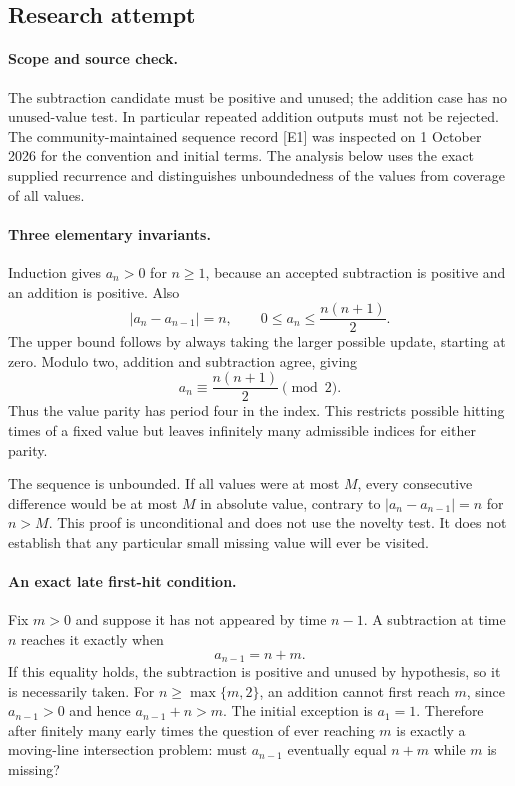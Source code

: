 \documentclass[11pt,a4paper]{article}
\begin{document}
\subsection{Research attempt}

\paragraph{Scope and source check.}
The subtraction candidate must be positive and unused; the addition
case has no unused-value test. In particular repeated addition outputs
must not be rejected. The community-maintained sequence record [E1]
was inspected on 1 October 2026 for the convention and initial terms.
The analysis below uses the exact supplied recurrence and distinguishes
unboundedness of the values from coverage of all values.

\paragraph{Three elementary invariants.}
Induction gives $a_n>0$ for $n\ge1$, because an accepted subtraction
is positive and an addition is positive. Also
\[
 |a_n-a_{n-1}|=n,\qquad
 0\le a_n\le\frac{n(n+1)}2.
\]
The upper bound follows by always taking the larger possible update,
starting at zero. Modulo two, addition and subtraction agree, giving
\[
                  a_n\equiv\frac{n(n+1)}2\pmod2.
\]
Thus the value parity has period four in the index. This restricts
possible hitting times of a fixed value but leaves infinitely many
admissible indices for either parity.

The sequence is unbounded. If all values were at most $M$, every
consecutive difference would be at most $M$ in absolute value, contrary
to $|a_n-a_{n-1}|=n$ for $n>M$. This proof is unconditional and does
not use the novelty test. It does not establish that any particular
small missing value will ever be visited.

\paragraph{An exact late first-hit condition.}
Fix $m>0$ and suppose it has not appeared by time $n-1$. A subtraction
at time $n$ reaches it exactly when
\[
                            a_{n-1}=n+m.
\]
If this equality holds, the subtraction is positive and unused by
hypothesis, so it is necessarily taken. For $n\ge\max\{m,2\}$, an
addition cannot first reach $m$, since $a_{n-1}>0$ and hence
$a_{n-1}+n>m$. The initial exception is $a_1=1$. Therefore after
finitely many early times the
question of ever reaching $m$ is exactly a moving-line intersection
problem: must $a_{n-1}$ eventually equal $n+m$ while $m$ is missing?
\end{document}
